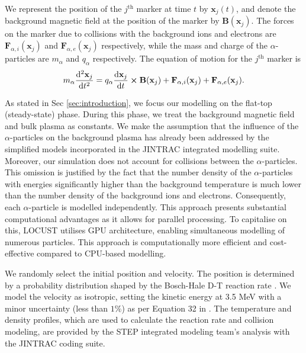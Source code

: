 \documentclass[10pt, a4paper, twoside]{article}
\begin{document}
We represent the position of the $j^{\text{th}}$ marker at time $t$ by $\mathbf{x}_j(t)$, and denote
the background magnetic field at the position of the marker by $\textbf{B}(\mathbf{x}_j)$.
The forces on the marker due to collisions with the background ions and electrons are $\textbf{F}_{\alpha,i}(\mathbf{x}_j)$ and $\textbf{F}_{\alpha,e}(\mathbf{x}_j)$ respectively, while the mass and charge of the $\alpha$-particles are $m_\alpha$ and $q_\alpha$ respectively. The equation of motion for the $j^{\text{th}}$ marker is
\begin{equation}
m_\alpha\dv[2]{\mathbf{x}_j}{t} = q_\alpha\dv{\mathbf{x}_j}{t}\cross\textbf{B}(\mathbf{x}_j) + \textbf{F}_{\alpha,i}(\mathbf{x}_j) + \textbf{F}_{\alpha,e}(\mathbf{x}_j).
\end{equation}

As stated in Sec \ref{sec:introduction}, we focus our modelling on the flat-top (steady-state) phase. During this phase, we treat the background magnetic field and bulk plasma as constants. We make the assumption that the influence of the $\alpha$-particles on the background plasma has already been addressed by the simplified models incorporated in the JINTRAC integrated modelling suite.
Moreover, our simulation does not account for collisions between the $\alpha$-particles. This omission is justified by the fact that the number density of the $\alpha$-particles with energies significantly higher than the background temperature is much lower than the number density of the background ions and electrons. Consequently, each $\alpha$-particle is modelled independently. This approach presents substantial computational advantages as it allows for parallel  processing.
To capitalise on this, LOCUST utilises GPU architecture, enabling simultaneous modelling of numerous particles. This approach is computationally more efficient and cost-effective compared to CPU-based modelling.

We randomly select the initial position and velocity. The position is determined by a probability distribution shaped by the Bosch-Hale D-T reaction rate \cite{bosch1992}. We model the velocity as isotropic, setting the kinetic energy at 3.5 MeV with a minor uncertainty (less than $1\%$) as per Equation 32 in \cite{brysk1973}. The temperature and density profiles, which are used to calculate the reaction rate and collision modeling, are provided by the STEP integrated modeling team's analysis with the JINTRAC coding suite.
\end{document}
